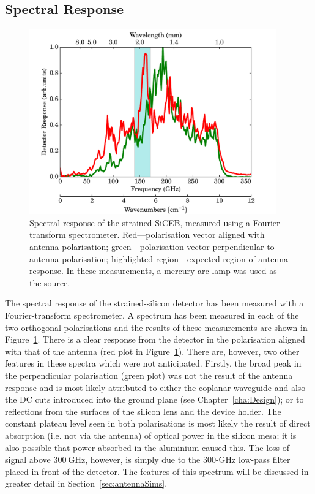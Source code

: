 \subsection{Spectral Response}\label{ssec:opticalStrainedSi_spectral}
\begin{figure}[tb]
\begin{center}
\includegraphics[width = 0.95\textwidth]{figures/strained_FTS}
\caption[Spectral response of the strained-SiCEB]{Spectral response of the strained-SiCEB, measured using a Fourier-transform spectrometer. Red---polarisation vector aligned with antenna polarisation; green---polarisation vector perpendicular to antenna polarisation; highlighted region---expected region of antenna response. In these measurements, a mercury arc lamp was used as the source.}
\label{fig:strainedSpectrum}
\end{center}
\end{figure}
The spectral response of the strained-silicon detector has been measured with a Fourier-transform spectrometer. A spectrum has been measured in each of the two orthogonal polarisations and the results of these measurements are shown in Figure~\ref{fig:strainedSpectrum}. There is a clear response from the detector in the polarisation aligned with that of the antenna (red plot in Figure~\ref{fig:strainedSpectrum}). There are, however, two other features in these spectra which were not anticipated. Firstly, the broad peak in the perpendicular polarisation (green plot) was not the result of the antenna response and is most likely attributed to either the coplanar waveguide and also the DC cuts introduced into the ground plane (see Chapter~\ref{cha:Design}); or to reflections from the surfaces of the silicon lens and the device holder. The constant plateau level seen in both polarisations is most likely the result of direct absorption (i.e. not via the antenna) of optical power in the silicon mesa; it is also possible that power absorbed in the aluminium caused this. The loss of signal above $300~\mathrm{GHz}$, however, is simply due to the 300-GHz low-pass filter placed in front of the detector. The features of this spectrum will be discussed in greater detail in Section~\ref{sec:antennaSims}.

